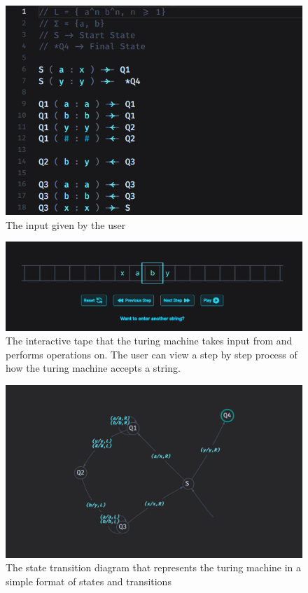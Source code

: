 \documentclass[12pt]{report}
\begin{document}
 
\begin{figure}[H]
\centering
  \includegraphics[scale=0.8 ]{inputOutput.png}
  \caption{The input given by the user}
\end{figure}


\begin{figure}[H]
  \includegraphics[width=\columnwidth ]{tapeOutput.png}
  \caption{The interactive tape that the turing machine takes input from and performs operations on. The user can view a step by step process of how the turing machine accepts a string.}
\end{figure}

\begin{figure}[H]
  \includegraphics[width=\columnwidth ]{graphOutput.png}
  \caption{The state transition diagram that represents the turing machine in a simple format of states and transitions}
\end{figure}
\end{document}

